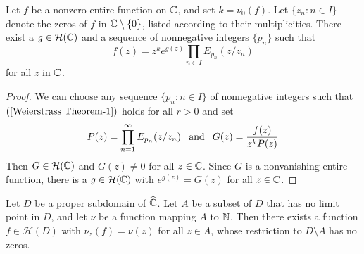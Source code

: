 \begin{theorem}
Let $f$ be a nonzero entire function on $\mathbb{C}$, and set $k=\nu_0(f)$. Let $\{z_n:n\in I\}$ denote the zeros of $f$ in $\mathbb{C}\setminus\{0\}$, listed according to their multiplicities. There exist a $g\in\mathcal{H}(\mathbb{C})$ and a sequence of nonnegative integers $\{p_n\}$ such that
\[f(z)=z^ke^{g(z)}\prod_{n\in I}E_{p_n}(z/z_n)\]
for all $z$ in $\mathbb{C}$.
\end{theorem}
\begin{proof}
We can choose any sequence $\{p_n:n\in I\}$ of nonnegative integers such that $(\ref{Weierstrass Theorem-1})$ holds for all $r>0$ and set
\[P(z)=\prod_{n=1}^{\infty}E_{p_n}(z/z_n)\hspace{8pt}\text{and}\hspace{8pt} G(z)=\frac{f(z)}{z^kP(z)}\]
Then $G\in\mathcal{H}(\mathbb{C})$ and $G(z)\neq 0$ for all $z\in\mathbb{C}$. Since $G$ is a nonvanishing entire function, there is a $g\in\mathcal{H}(\mathbb{C})$ with $e^{g(z)}=G(z)$ for all $z\in\mathbb{C}$.
\end{proof}
\begin{theorem}\label{holomorphic prescribed zero}
Let $D$ be a proper subdomain of $\widehat{\mathbb{C}}$. Let $A$ be a subset of $D$ that has no limit point in $D$, and let $\nu$ be a function mapping $A$ to $\mathbb{N}$. Then there exists a function $f\in\mathcal{H}(D)$ with $\nu_z(f)=\nu(z)$ for all $z\in A$, whose restriction to $D\setminus A$ has no zeros.
\end{theorem}
